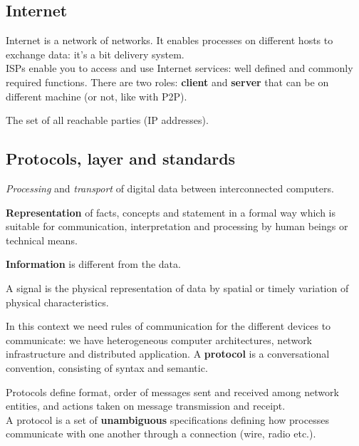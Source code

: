 \subsection{Internet}
Internet is a network of networks. It enables processes on different hosts to exchange data: it's a bit delivery system.\\
ISPs enable you to access and use Internet services: well defined and commonly required functions. There are two roles: \textbf{client} and \textbf{server} that can be on different machine (or not, like with P2P).

\begin{definition}[Internet]
	The set of all reachable parties (IP addresses).
\end{definition}

\subsection{Protocols, layer and standards}
\begin{definition}
	\textit{Processing} and \textit{transport} of digital data between interconnected computers.
\end{definition}

\begin{definition}[Data]
	\textbf{Representation} of facts, concepts and statement in a formal way which is suitable for communication, interpretation and processing by human beings or technical means.
\end{definition}

\begin{note}
	\textbf{Information} is different from the data.
\end{note}

\begin{definition}[Signal]
	A signal is the physical representation of data by spatial or timely variation of physical characteristics.
\end{definition}

In this context we need rules of communication for the different devices to communicate: we have heterogeneous computer architectures, network infrastructure  and distributed application. A \textbf{protocol} is a conversational convention, consisting of syntax and semantic.

\begin{definition}[Protocol]
	Protocols define format, order of messages sent and received among network entities, and actions taken on message transmission and receipt.\\
	A protocol is a set of \textbf{unambiguous} specifications defining how processes communicate with one another through a connection (wire, radio etc.).
\end{definition}

